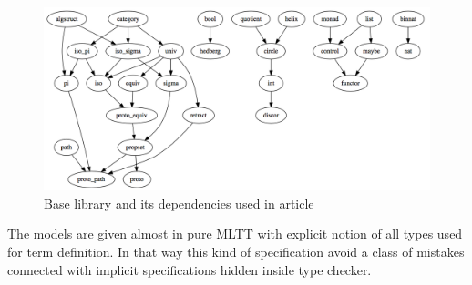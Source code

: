 \documentclass{article}
\begin{document}
\begin{figure}[h]
  \centerline{\includegraphics[scale=0.20]{baselib}}
  \caption{Base library and its dependencies used in article}
\end{figure}

The models are given almost in pure MLTT with explicit notion of all types used
for term definition. In that way this kind of specification avoid a class of mistakes
connected with implicit specifications hidden inside type checker.

\newpage


\end{document}
